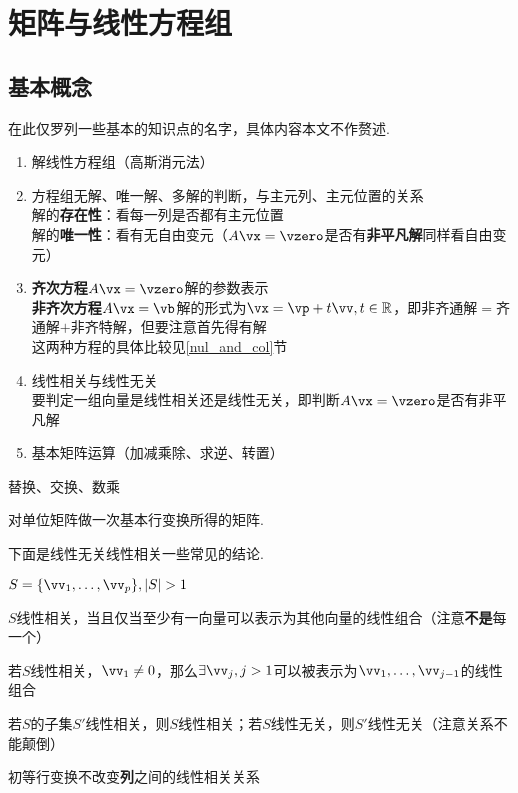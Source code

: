 
\section{矩阵与线性方程组}
\subsection{基本概念}
在此仅罗列一些基本的知识点的名字，具体内容本文不作赘述.
\begin{enumerate}
	\item 解线性方程组（高斯消元法）
	\item 方程组无解、唯一解、多解的判断，与主元列、主元位置的关系\\
		解的\textbf{存在性}：看每一列是否都有主元位置\\
		解的\textbf{唯一性}：看有无自由变元（$A\vx=\vzero$是否有\textbf{非平凡解}同样看自由变元）
	\item \textbf{齐次方程}$A\vx=\vzero$解的参数表示\\
		\textbf{非齐次方程}$A\vx=\vb$解的形式为$\vx=\vp+t\vv,t\in\mathbb{R}$，即非齐通解$=$齐通解$+$非齐特解，但要注意首先得有解\\
		这两种方程的具体比较见\ref{nul_and_col}节
	\item 线性相关与线性无关\\
	要判定一组向量是线性相关还是线性无关，即判断$A\vx=\vzero$是否有非平凡解
	\item 基本矩阵运算（加减乘除、求逆、转置）
\end{enumerate}
\begin{definition}
替换、交换、数乘
\end{definition}
\begin{definition}[初等(elementary)矩阵]
对单位矩阵做一次基本行变换所得的矩阵.
\end{definition}
\par 下面是线性无关线性相关一些常见的结论.
\begin{theorem}
\label{linear_relationship}
$S=\{\vv_1,\dots,\vv_p\},|S|>1$
\begin{partlist}
	\item $S$线性相关，当且仅当至少有一向量可以表示为其他向量的线性组合（注意\textbf{不是}每一个）
	\item 若$S$线性相关，$\vv_1\ne 0$，那么$\exists\vv_j,j>1$可以被表示为$\vv_1,\dots,\vv_{j-1}$的线性组合
	\item 若$S$的子集$S'$线性相关，则$S$线性相关；若$S$线性无关，则$S'$线性无关（注意关系不能颠倒）
	\item 初等行变换不改变\textbf{列}之间的线性相关关系
\end{partlist}
\end{theorem}

